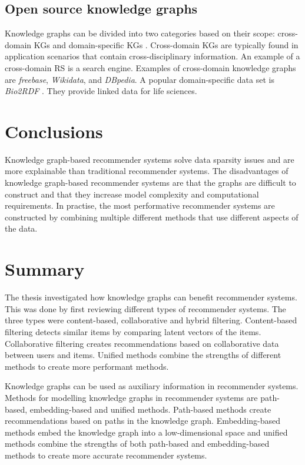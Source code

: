 \documentclass[english, 12pt, a4paper, sci, utf8, a-2b, online]{aaltothesis}
\begin{document}
\subsection{Open source knowledge graphs}
\label{subsec:open_source_KG}

Knowledge graphs can be divided into two categories based on their scope: cross-domain KGs and domain-specific KGs \parencite{guo2020survey}. Cross-domain KGs are typically found in application scenarios that contain cross-disciplinary information. An example of a cross-domain RS is a search engine. Examples of cross-domain knowledge graphs are \textit{freebase}, \textit{Wikidata}, and \textit{DBpedia}. A popular domain-specific data set is \textit{Bio2RDF} \parencite{guo2020survey}. They provide linked data for life sciences. 



\newpage

\section{Conclusions}

Knowledge graph-based recommender systems solve data sparsity issues and are more explainable than traditional recommender systems. The disadvantages of knowledge graph-based recommender systems are that the graphs are difficult to construct and that they increase model complexity and computational requirements. In practise, the most performative recommender systems are constructed by combining multiple different methods that use different aspects of the data. 


\section{Summary}

The thesis investigated how knowledge graphs can benefit recommender systems. This was done by first reviewing different types of recommender systems. The three types were content-based, collaborative and hybrid filtering. Content-based filtering detects similar items by comparing latent vectors of the items. Collaborative filtering creates recommendations based on collaborative data between users and items. Unified methods combine the strengths of different methods to create more performant methods.

Knowledge graphs can be used as auxiliary information in recommender systems. Methods for modelling knowledge graphs in recommender systems are path-based, embedding-based and unified methods. Path-based methods create recommendations based on paths in the knowledge graph. Embedding-based methods embed the knowledge graph into a low-dimensional space and unified methods combine the strengths of both path-based and embedding-based methods to create more accurate recommender systems.
\end{document}
